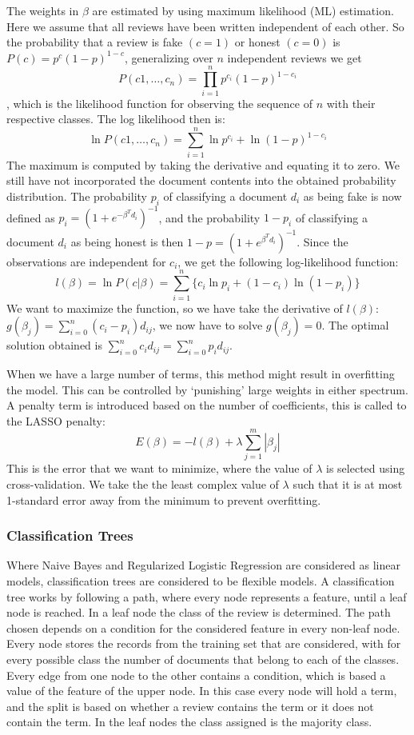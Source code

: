 \documentclass[a4paper,11pt]{article}
\begin{document}
The weights in $\beta$ are estimated by using maximum likelihood (ML) estimation. Here we assume that all reviews have been written independent of each other. So the probability that a review is fake $(c = 1)$ or honest $(c=0)$ is $P(c) = p^c(1-p)^{1-c}$, generalizing over $n$ independent reviews we get \[P(c1,\ldots,c_n) = \prod\limits_{i=1}^{n}p^{c_i}(1-p)^{1-c_i}\], which is the likelihood function for observing the sequence of $n$ with their respective classes. The log likelihood then is: 
\[\ln P(c1,\ldots,c_n) = \sum\limits_{i=1}^{n}\ln p^{c_i}+\ln (1-p)^{1-c_i}\] The maximum is computed by taking the derivative and equating it to zero. We still have not incorporated the document contents into the obtained probability distribution. The probability $p_i$ of classifying a document $d_i$ as being fake is now defined as $p_i = (1+e^{-\beta^T d_i})^{-1}$, and the probability $1-p_i$ of classifying a document $d_i$ as being honest is then $1-p = (1+e^{\beta^T d_i})^{-1}$. Since the observations are independent for $c_i$, we get the following log-likelihood function: 
\[l(\beta) = \ln P(c|\beta) = \sum\limits_{i=1}^n \{c_i \ln p_i + (1-c_i)\ln(1-p_i)\}\]
We want to maximize the function, so we have take the derivative of $l(\beta)$: $g(\beta_j) = \sum\limits_{i=0}^n (c_i-p_i)d_{ij}$, we now have to solve $g(\beta_j) = 0$. The optimal solution obtained is $\sum\limits_{i=0}^n c_i d_{ij} = \sum\limits_{i=0}^n p_i d_{ij}$.

When we have a large number of terms, this method might result in overfitting the model. This can be controlled by `punishing' large weights in either spectrum. A penalty term is introduced based on the number of coefficients, this is called to the LASSO penalty: \[E(\beta) = -l(\beta) + \lambda\sum\limits_{j=1}^{m} |\beta_j|\] This is the error that we want to minimize, where the value of $\lambda$ is selected using cross-validation. We take the the least complex value of $\lambda$ such that it is at most 1-standard error away from the minimum to prevent overfitting.

\subsubsection{Classification Trees}
\label{section:classTreesExplained}
Where Naive Bayes and Regularized Logistic Regression are considered as linear models, classification trees are considered to be flexible models. A classification tree works by following a path, where every node represents a feature, until a leaf node is reached. In a leaf node the class of the review is determined. The path chosen depends on a condition for the considered feature in every non-leaf node. Every node stores the records from the training set that are considered, with for every possible class the number of documents that belong to each of the classes. Every edge from one node to the other contains a condition, which is based a value of the feature of the upper node. In this case every node will hold a term, and the split is based on whether a review contains the term or it does not contain the term. In the leaf nodes the class assigned is the majority class. 
\end{document}
